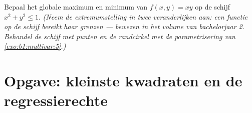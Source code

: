 \begin{exercise}[$\star\star\star$]\label{exo:b1:multivar:12}
Bepaal het globale maximum en minimum van $f(x, y) = xy$ op de
 schijf $x^2 + y^2 \leq 1$. \emph{(Neem de extremumstelling
in twee veranderlijken aan: een  functie op de 
schijf bereikt haar grenzen --- bewezen in het volume van
bachelorjaar 2. Behandel de  schijf met  punten en de
randcirkel met de parametrisering van
\cref{exo:b1:multivar:5}.)}
\end{exercise}

\section{Opgave: kleinste kwadraten en de regressierechte}

